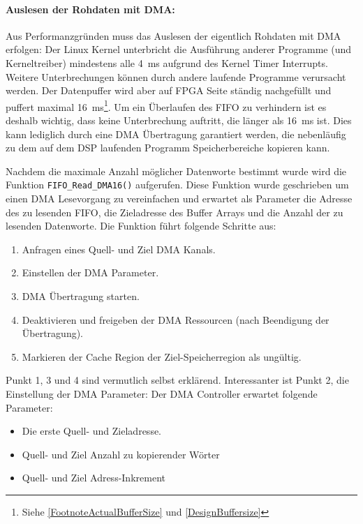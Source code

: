 \paragraph{Auslesen der Rohdaten mit DMA:}
Aus Performanzgründen muss das Auslesen der eigentlich Rohdaten mit DMA erfolgen: Der Linux Kernel unterbricht die Ausführung anderer Programme (und Kerneltreiber) mindestens alle \SI{4}{\milli\second} aufgrund des Kernel Timer Interrupts. Weitere Unterbrechungen können durch andere laufende Programme verursacht werden. Der Datenpuffer wird aber auf FPGA Seite ständig nachgefüllt und puffert maximal \SI{16}{\milli\second}\footnote{Siehe \ref{FootnoteActualBufferSize} und \ref{DesignBuffersize}}. Um ein Überlaufen des FIFO zu verhindern ist es deshalb wichtig, dass keine Unterbrechung auftritt, die länger als \SI{16}{\milli\second} ist. Dies kann lediglich durch eine DMA Übertragung garantiert werden, die nebenläufig zu dem auf dem DSP laufenden Programm Speicherbereiche kopieren kann.

Nachdem die maximale Anzahl möglicher Datenworte bestimmt wurde wird die Funktion \lstinline$FIFO_Read_DMA16()$ aufgerufen. Diese Funktion wurde geschrieben um einen DMA Lesevorgang zu vereinfachen und erwartet als Parameter die Adresse des zu lesenden FIFO, die Zieladresse des Buffer Arrays und die Anzahl der zu lesenden Datenworte. Die Funktion führt folgende Schritte aus:

\begin{enumerate}
    \item Anfragen eines Quell- und Ziel DMA Kanals.
    \item Einstellen der DMA Parameter.
    \item DMA Übertragung starten.
    \item Deaktivieren und freigeben der DMA Ressourcen (nach Beendigung der Übertragung).
    \item Markieren der Cache Region der Ziel-Speicherregion als ungültig.
\end{enumerate}

Punkt 1, 3 und 4 sind vermutlich selbst erklärend. Interessanter ist Punkt 2, die Einstellung der DMA Parameter: Der DMA Controller erwartet folgende Parameter: 
\begin{itemize}
    \item Die erste Quell- und Zieladresse.
    \item Quell- und Ziel Anzahl zu kopierender Wörter
    \item Quell- und Ziel Adress-Inkrement
\end{itemize}

